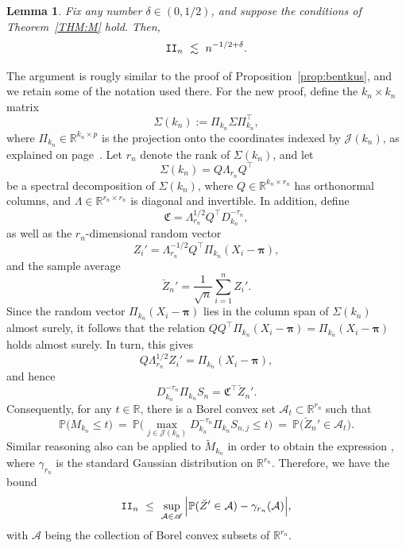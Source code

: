 \documentclass[aos,preprint]{imsart}
\numberwithin{equation}{section}
\theoremstyle{plain}
\newtheorem{lemma}{Lemma}[section]
\newcommand{\R}{\mathbb{R}}
\newcommand{\bII}{\textup{\texttt{II}}}
\newcommand{\J}{\mathcal{J}}
\renewcommand{\P}{\mathbb{P}}
\newcommand{\ttop}{^{\top}}
\newcommand{\ts}{\textstyle}
\newcommand{\1}{{\bf{1}}}
\newcommand{\0}{\mathbf{0}}
\begin{document}
\begin{lemma}\label{lem:IIM}Fix any number $\delta\in(0,1/2)$, and suppose the conditions of Theorem~\ref{THM:M} hold. Then,
\begin{equation}
\bII_n \ \lesssim \  n^{-1/2+\delta}.
\end{equation}
\end{lemma}
\proof The argument is rougly similar to the proof of Proposition~\ref{prop:bentkus}, and we retain some of the notation used there. For the new proof, define the $k_n\times k_n$ matrix 
\begin{equation}\label{eqn:sigmakdef}
\Sigma(k_n):=\Pi_{k_n}\Sigma\Pi_{k_n}\ttop,
\end{equation}
where $\Pi_{k_n}\in\R^{k_n\times p}$ is the projection onto the coordinates indexed by $\J(k_n)$, as explained on page~\pageref{eqn:IInbound}. Let $r_n$ denote the rank of $\Sigma(k_n)$, and let 
$$\Sigma(k_n) = Q\Lambda_{r_n} Q\ttop$$
be a spectral decomposition of $\Sigma(k_n)$, where $Q\in\R^{k_n\times r_n}$ has orthonormal columns, and $\Lambda\in\R^{r_n\times r_n}$ is diagonal and invertible. In addition, define
$$\mathfrak{C}=\Lambda_{r_n}^{1/2}Q\ttop D_{k_n}^{-\tau_n},$$
as well as the $r_n$-dimensional random vector
$$Z_i'=\Lambda_{r_n}^{-1/2}Q\ttop \Pi_{k_n}(X_i-\boldsymbol\pi),$$
and the sample average
$$\breve Z_n'= \ts\frac{1}{\sqrt n}\sum_{i=1}^n Z_i'.$$
Since the random vector $\Pi_{k_n}(X_i-\boldsymbol \pi)$ lies in the column span of $\Sigma(k_n)$ almost surely, it follows that the relation $QQ\ttop \Pi_{k_n}(X_i-\boldsymbol\pi)=\Pi_{k_n}(X_i-\boldsymbol\pi)$ holds almost surely. In turn, this gives
$$Q\Lambda_{r_n}^{1/2} Z_i' = \Pi_{k_n}(X_i-\boldsymbol \pi),$$
and hence
%
 $$D_{k_n}^{-\tau_n}\Pi_{k_n}S_n = \mathfrak{C}\ttop\breve Z_n'.$$
 Consequently, for any $t\in\R$, there is a Borel convex set $\mathcal{A}_t\subset\R^{r_n}$ such that 
$$\P\big(M_{k_n}\leq t) \ = \  \P\Big(\max_{j\in\J(k_n)}D_{k_n}^{-\tau_n}\Pi_{k_n}S_{n,j}  \leq t\Big) \ = \  \P\big(\breve Z_n'\in\mathcal{A}_t\big).$$
Similar reasoning also can be applied to $\tilde M_{k_n}$ in order to obtain the expression \smash{$\P(\tilde M_{k_n}\leq t)= \gamma_{r_n}(\mathcal{A}_t)$}, where $\gamma_{r_n}$ is the standard Gaussian distribution on $\R^{r_n}$. 
%
Therefore, we have the bound
\begin{equation}
\bII_n \ \leq  \ \sup_{\mathcal{A}\in\mathscr{A}}\Big| \P(\breve Z' \in\mathcal{A}) - \gamma_{r_n}(\mathcal{A})\Big|,
\end{equation}
with $\mathscr{A}$ being the collection of Borel convex subsets of $\R^{r_n}$.
\end{document}
